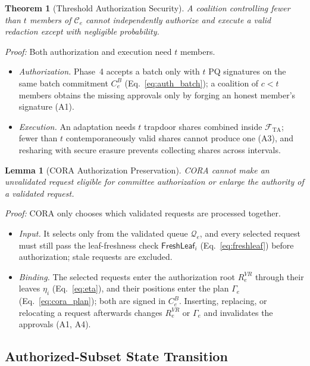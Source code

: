 \documentclass[lettersize,journal]{IEEEtran}
\newtheorem{theorem}{Theorem}
\newtheorem{lemma}{Lemma}
\begin{document}
\begin{theorem}[Threshold Authorization Security]
A coalition controlling fewer than $t$ members of
$\mathcal{C}_e$ cannot independently authorize and execute a valid
redaction except with negligible probability.
\end{theorem}

\emph{Proof:} Both authorization and execution need $t$ members.
\begin{itemize}[leftmargin=*,nosep]
\item \emph{Authorization.} Phase~4 accepts a batch only with $t$ PQ
signatures on the same batch commitment $C_e^B$
(Eq.~\eqref{eq:auth_batch}); a coalition of $c<t$ members obtains the
missing approvals only by forging an honest member's signature (A1).
\item \emph{Execution.} An adaptation needs $t$ trapdoor shares combined
inside $\mathcal{F}_{\mathrm{TA}}$; fewer than $t$ contemporaneously
valid shares cannot produce one (A3), and resharing with secure erasure
prevents collecting shares across intervals.
\end{itemize}

\begin{lemma}[CORA Authorization Preservation]
CORA cannot make an unvalidated request eligible for committee
authorization or enlarge the authority of a validated request.
\end{lemma}

\emph{Proof:} CORA only chooses which validated requests are processed
together.
\begin{itemize}[leftmargin=*,nosep]
\item \emph{Input.} It selects only from the validated queue
$\mathcal{Q}_e$, and every selected request must still pass the
leaf-freshness check $\mathsf{FreshLeaf}_i$ (Eq.~\eqref{eq:freshleaf})
before authorization; stale requests are excluded.
\item \emph{Binding.} The selected requests enter the authorization root
$R_e^{VR}$ through their leaves $\eta_i$ (Eq.~\eqref{eq:eta}), and their
positions enter the plan $\Gamma_e$ (Eq.~\eqref{eq:cora_plan}); both are
signed in $C_e^B$. Inserting, replacing, or relocating a request
afterwards changes $R_e^{VR}$ or $\Gamma_e$ and invalidates the
approvals (A1, A4).
\end{itemize}

\subsection{Authorized-Subset State Transition}
\end{document}
